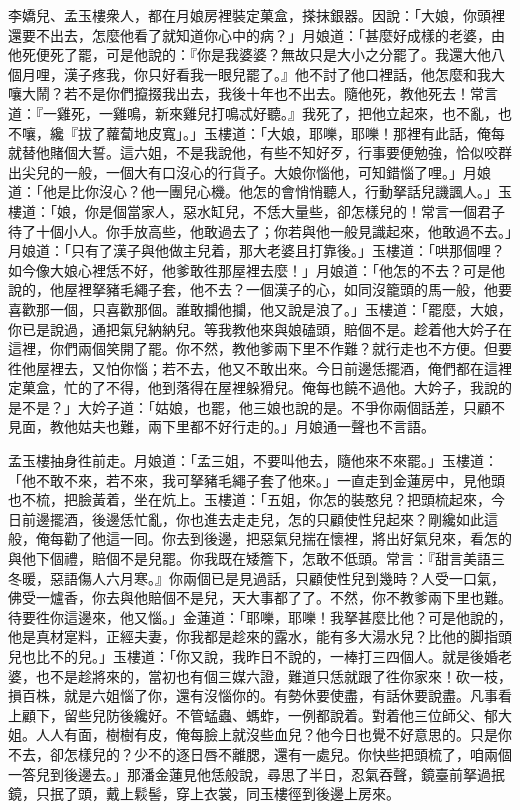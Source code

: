 李嬌兒、孟玉樓衆人，都在月娘房裡裝定菓盒，搽抹銀器。因說：「大娘，你頭裡還要不出去，怎麼他看了就知道你心中的病？」月娘道：「甚麼好成樣的老婆，由他死便死了罷，可是他說的：『你是我婆婆？無故只是大小之分罷了。我還大他八個月哩，漢子疼我，你只好看我一眼兒罷了。』他不討了他口裡話，他怎麼和我大嚷大鬧？{}若不是你們攛掇我出去，我後十年也不出去。隨他死，教他死去！常言道：『一雞死，一雞鳴，新來雞兒打鳴忒好聽。』{}我死了，把他立起來，也不亂，也不嚷，纔『拔了蘿蔔地皮寬」。」玉樓道：「大娘，耶嚛，耶嚛！那裡有此話，俺每就替他賭個大誓。這六姐，不是我說他，有些不知好歹，行事要便勉強，恰似咬群出尖兒的一般，一個大有口沒心的行貨子。{}大娘你惱他，可知錯惱了哩。」{}月娘道：「他是比你沒心？他一團兒心機。他怎的會悄悄聽人，行動拏話兒譏諷人。」玉樓道：「娘，你是個當家人，惡水缸兒，不恁大量些，卻怎樣兒的！常言一個君子待了十個小人。{}你手放高些，他敢過去了；你若與他一般見識起來，他敢過不去。」月娘道：「只有了漢子與他做主兒着，那大老婆且打靠後。」玉樓道：「哄那個哩？如今像大娘心裡恁不好，他爹敢徃那屋裡去麼！」月娘道：「他怎的不去？可是他說的，他屋裡拏豬毛繩子套，他不去？一個漢子的心，如同沒籠頭的馬一般，他要喜歡那一個，只喜歡那個。誰敢攔他攔，他又說是浪了。」{}玉樓道：「罷麼，大娘，你已是說過，通把氣兒納納兒。等我教他來與娘磕頭，賠個不是。趁着他大妗子在這裡，你們兩個笑開了罷。你不然，教他爹兩下里不作難？就行走也不方便。但要徃他屋裡去，又怕你惱；若不去，他又不敢出來。今日前邊恁擺酒，俺們都在這裡定菓盒，忙的了不得，他到落得在屋裡躲猾兒。俺每也饒不過他。大妗子，我說的是不是？」大妗子道：「姑娘，也罷，他三娘也說的是。不爭你兩個話差，只顧不見面，教他姑夫也難，兩下里都不好行走的。」月娘通一聲也不言語。

孟玉樓抽身徃前走。{}月娘道：「孟三姐，不要叫他去，隨他來不來罷。」玉樓道：「他不敢不來，若不來，我可拏豬毛繩子套了他來。」{}{}一直走到金蓮房中，見他頭也不梳，把臉黃着，坐在炕上。玉樓道：「五姐，你怎的裝憨兒？把頭梳起來，今日前邊擺酒，後邊恁忙亂，你也進去走走兒，怎的只顧使性兒起來？剛纔如此這般，俺每勸了他這一囘。你去到後邊，把惡氣兒揣在懷裡，將出好氣兒來，看怎的與他下個禮，賠個不是兒罷。你我既在矮簷下，怎敢不低頭。常言：『甜言美語三冬暖，惡語傷人六月寒。』你兩個已是見過話，只顧使性兒到幾時？人受一口氣，佛受一爐香，你去與他賠個不是兒，天大事都了了。不然，你不教爹兩下里也難。待要徃你這邊來，他又惱。」{}金蓮道：「耶嚛，耶嚛！我拏甚麼比他？{}可是他說的，他是真材寔料，正經夫妻，你我都是趁來的露水，能有多大湯水兒？比他的脚指頭兒也比不的兒。」玉樓道：「你又說，我昨日不說的，一棒打三四個人。就是後婚老婆，也不是趁將來的，當初也有個三媒六證，難道只恁就跟了徃你家來！砍一枝，損百株，就是六姐惱了你，還有沒惱你的。有勢休要使盡，有話休要說盡。凡事看上顧下，留些兒防後纔好。不管蜢蟲、螞蚱，一例都說着。對着他三位師父、郁大姐。人人有面，樹樹有皮，俺每臉上就沒些血兒？他今日也覺不好意思的。只是你不去，卻怎樣兒的？少不的逐日唇不離腮，還有一處兒。你快些把頭梳了，咱兩個一答兒到後邊去。」那潘金蓮見他恁般說，尋思了半日，忍氣吞聲，{}鏡臺前拏過抿鏡，只抿了頭，戴上鬏髻，穿上衣裳，同玉樓徑到後邊上房來。

